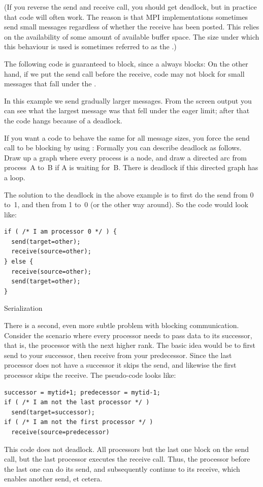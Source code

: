 (If you reverse the send and receive call, you should get deadlock,
but in practice that code will often work. The reason is that
MPI implementations sometimes send small messages regardless of whether
the receive has been posted. This relies on the availability of
some amount of available buffer space. The size under which this behaviour
is used is sometimes referred to as the .)

The following code is guaranteed to block, since a 
always blocks:
On the other hand, if we put the send call before the receive,
code may not block for small messages
that fall under the .

In this example we send
gradually larger messages. From the screen output you can see what
the largest message was that fell under the eager limit; after that the code
hangs because of a deadlock.
%
%
%


If you want a code to behave the same for all message sizes,
you force the send call to be blocking by using :
Formally you can describe deadlock as follows. Draw up a graph where
every process is a node, and draw a directed arc from process~A to~B if
A is waiting for~B. There is deadlock if this directed graph has a
loop.

The solution to the deadlock in the above example
is to first do the send from 0 to~1, and then from 1 to~0 (or the other way around). So the code would look like:
\begin{lstlisting}
if ( /* I am processor 0 */ ) {
  send(target=other);
  receive(source=other);
} else {
  receive(source=other);
  send(target=other);
}
\end{lstlisting}

 {Serialization}

There is a second, even more subtle problem with blocking
communication. Consider the scenario where every processor needs to
pass data to its successor, that is, the processor with the next
higher rank. The basic idea would be to first send to your successor,
then receive from your predecessor. Since the last processor does not
have a successor it skips the send, and likewise the first processor
skips the receive. The pseudo-code looks like:
\begin{lstlisting}
successor = mytid+1; predecessor = mytid-1;
if ( /* I am not the last processor */ )
  send(target=successor);
if ( /* I am not the first processor */ )
  receive(source=predecessor)
\end{lstlisting}
This code does not deadlock. All processors but the last one block on
the send call, but the last processor executes the receive call. Thus,
the processor before the last one can do its send, and subsequently
continue to its receive, which enables another send, et cetera.

